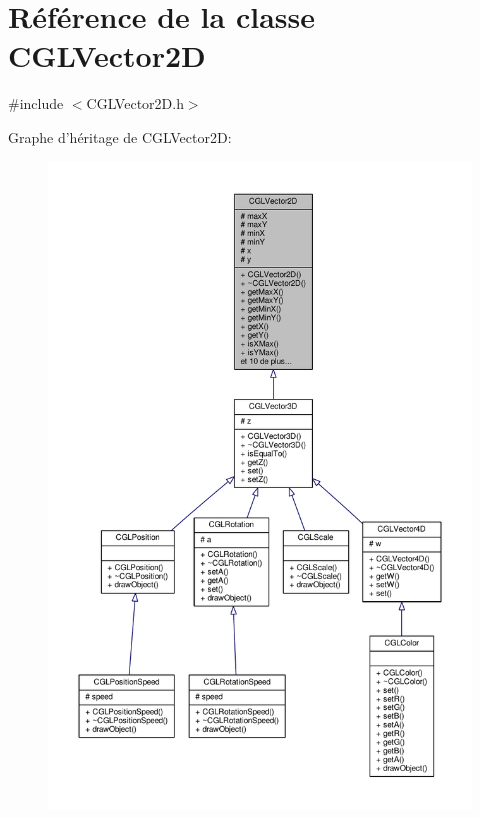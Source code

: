 \hypertarget{class_c_g_l_vector2_d}{\section{Référence de la classe C\-G\-L\-Vector2\-D}
\label{class_c_g_l_vector2_d}
}


{\ttfamily \#include $<$C\-G\-L\-Vector2\-D.\-h$>$}



Graphe d'héritage de C\-G\-L\-Vector2\-D\-:
\nopagebreak
\begin{figure}[H]
\begin{center}
\leavevmode
\includegraphics[width=350pt]{d2/def/class_c_g_l_vector2_d__inherit__graph}
\end{center}
\end{figure}


